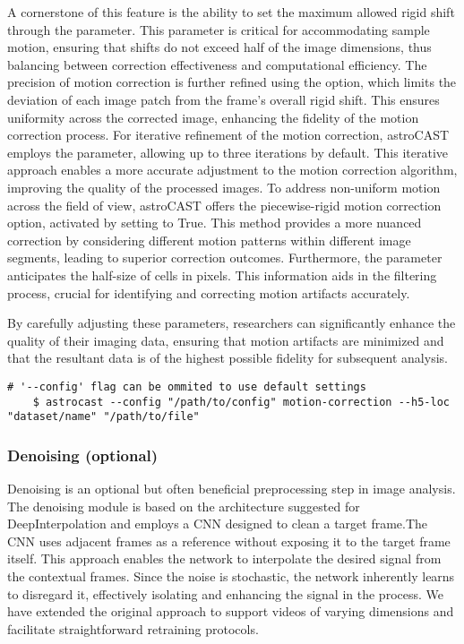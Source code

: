 A cornerstone of this feature is the ability to set the maximum allowed rigid shift through the  parameter. This parameter is critical for accommodating sample motion, ensuring that shifts do not exceed half of the image dimensions, thus balancing between correction effectiveness and computational efficiency. The precision of motion correction is further refined using the  option, which limits the deviation of each image patch from the frame's overall rigid shift. This ensures uniformity across the corrected image, enhancing the fidelity of the motion correction process. For iterative refinement of the motion correction, astroCAST employs the  parameter, allowing up to three iterations by default. This iterative approach enables a more accurate adjustment to the motion correction algorithm, improving the quality of the processed images. To address non-uniform motion across the field of view, astroCAST offers the piecewise-rigid motion correction option, activated by setting  to True. This method provides a more nuanced correction by considering different motion patterns within different image segments, leading to superior correction outcomes. Furthermore, the  parameter anticipates the half-size of cells in pixels. This information aids in the filtering process, crucial for identifying and correcting motion artifacts accurately.

By carefully adjusting these parameters, researchers can significantly enhance the quality of their imaging data, ensuring that motion artifacts are minimized and that the resultant data is of the highest possible fidelity for subsequent analysis.

\begin{lstlisting}[style=bashStyle]
    # '--config' flag can be ommited to use default settings
    $ astrocast --config "/path/to/config" motion-correction --h5-loc "dataset/name" "/path/to/file"
\end{lstlisting}

\subsubsection{Denoising (optional)}

Denoising is an optional but often beneficial preprocessing step in image analysis. The denoising module is based on the architecture suggested for DeepInterpolation\citep{lecoq_removing_2021} and employs a \ac{CNN} designed to clean a target frame.The \ac{CNN} uses adjacent frames as a reference without exposing it to the target frame itself. This approach enables the network to interpolate the desired signal from the contextual frames. Since the noise is stochastic, the network inherently learns to disregard it, effectively isolating and enhancing the signal in the process. We have extended the original approach to support videos of varying dimensions and facilitate straightforward retraining protocols.

